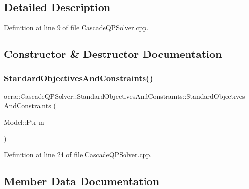 \subsection{Detailed Description}


Definition at line 9 of file Cascade\+Q\+P\+Solver.\+cpp.



\subsection{Constructor \& Destructor Documentation}
\hypertarget{structocra_1_1CascadeQPSolver_1_1StandardObjectivesAndConstraints_afa2f8a2043316e306b16bb8edb26b6f4}{}\label{structocra_1_1CascadeQPSolver_1_1StandardObjectivesAndConstraints_afa2f8a2043316e306b16bb8edb26b6f4} 
\subsubsection{\texorpdfstring{Standard\+Objectives\+And\+Constraints()}{StandardObjectivesAndConstraints()}}
{\footnotesize\ttfamily ocra\+::\+Cascade\+Q\+P\+Solver\+::\+Standard\+Objectives\+And\+Constraints\+::\+Standard\+Objectives\+And\+Constraints (\begin{DoxyParamCaption}\item[{Model\+::\+Ptr}]{m }\end{DoxyParamCaption})\hspace{0.3cm}{\ttfamily [inline]}}



Definition at line 24 of file Cascade\+Q\+P\+Solver.\+cpp.



\subsection{Member Data Documentation}
\hypertarget{structocra_1_1CascadeQPSolver_1_1StandardObjectivesAndConstraints_a31b476355775f3c5ec5caf75722325b4}{}\label{structocra_1_1CascadeQPSolver_1_1StandardObjectivesAndConstraints_a31b476355775f3c5ec5caf75722325b4} 
